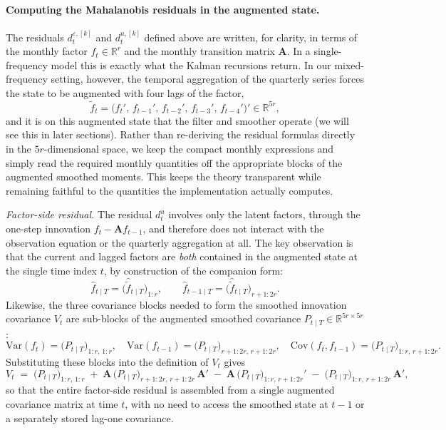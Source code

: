 \documentclass[11pt, a4paper, oneside]{article}
\newcommand{\mA}{\mathbf{A}}
\begin{document}
\paragraph{Computing the Mahalanobis residuals in the augmented state.}
The residuals $d^{\varepsilon,[k]}_t$ and $d^{u,[k]}_t$ defined above
are written, for clarity, in terms of the monthly factor
$f_t \in \mathbb{R}^r$ and the monthly transition matrix $\mA$. In a
single-frequency model this is exactly what the Kalman recursions
return. In our mixed-frequency setting, however, the temporal
aggregation of the quarterly series forces the state to be augmented
with four lags of the factor,
\[
\tilde{f}_t = \big(f_t',\, f_{t-1}',\, f_{t-2}',\, f_{t-3}',\, f_{t-4}'\big)'
\in \mathbb{R}^{5r},
\]
and it is on this augmented state that the filter and smoother
operate (we will see this in later sections). Rather than re-deriving
the residual formulas directly in the $5r$-dimensional space, we keep
the compact monthly expressions and simply read the required monthly
quantities off the appropriate blocks of the augmented smoothed
moments. This keeps the theory transparent while remaining faithful
to the quantities the implementation actually computes.

\medskip
\noindent\emph{Factor-side residual.}
The residual $d^u_t$ involves only the latent factors, through the
one-step innovation $f_t - \mA f_{t-1}$, and therefore does not
interact with the observation equation or the quarterly aggregation
at all. The key observation is that the current and lagged factors
are \emph{both} contained in the augmented state at the single time
index $t$, by construction of the companion form:
\[
\hat{f}_{t \mid T} = \big(\hat{\tilde{f}}_{t \mid T}\big)_{1:r},
\qquad
\hat{f}_{t-1 \mid T} = \big(\hat{\tilde{f}}_{t \mid T}\big)_{r+1:2r}.
\]
Likewise, the three covariance blocks needed to form the smoothed
innovation covariance $V_t$ are sub-blocks of the augmented smoothed
covariance $P_{t \mid T} \in \mathbb{R}^{5r \times 5r}$:
\[
\mathrm{Var}(f_t) = \big(P_{t \mid T}\big)_{1:r,\,1:r},
\quad
\mathrm{Var}(f_{t-1}) = \big(P_{t \mid T}\big)_{r+1:2r,\,r+1:2r},
\quad
\mathrm{Cov}(f_t, f_{t-1}) = \big(P_{t \mid T}\big)_{1:r,\,r+1:2r}.
\]
Substituting these blocks into the definition of $V_t$ gives
\[
V_t \;=\;
\big(P_{t \mid T}\big)_{1:r,\,1:r}
\;+\; \mA\,\big(P_{t \mid T}\big)_{r+1:2r,\,r+1:2r}\,\mA'
\;-\; \mA\,\big(P_{t \mid T}\big)_{1:r,\,r+1:2r}'
\;-\; \big(P_{t \mid T}\big)_{1:r,\,r+1:2r}\,\mA',
\]
so that the entire factor-side residual is assembled from a single
augmented covariance matrix at time $t$, with no need to access the
smoothed state at $t-1$ or a separately stored lag-one covariance.
\end{document}
